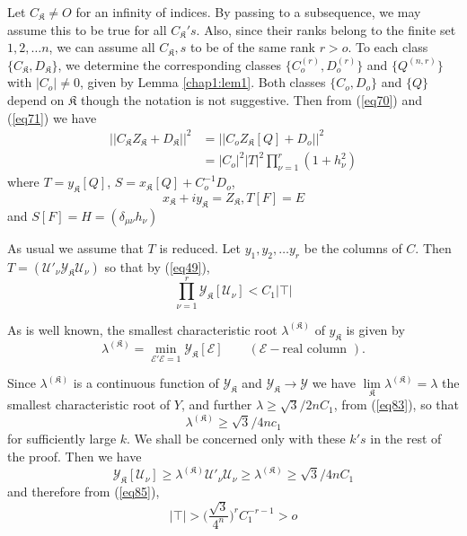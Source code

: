 \medskip
{}
Let $C_\mathfrak{K}\neq O$ for an infinity of indices. By passing to a
subsequence, we may assume this to be true for all
$C_\mathfrak{K}'s$. Also, since their ranks belong to the finite set
$1, 2, \ldots n$, we can assume all $C_\mathfrak{K}, s$ to be of the
same rank $r > o$. To each class $\{C_\mathfrak{K}, D_\mathfrak{K} \}$,
we determine the corresponding classes $\{C^{(r)}_o, D^{(r)}_o\}$ and
$\{Q^{(n, r)}\}$ with $|C_o | \neq 0$, given by Lemma \ref{chap1:lem1}. Both
classes $\{C_o, D_o\}$ and $\{Q \}$ depend on $\mathfrak{K}$ though the
notation is not suggestive. Then from (\ref{eq70}) and (\ref{eq71}) we have 
\begin{align*}
||C_\mathfrak{K}Z_\mathfrak{K} + D_\mathfrak{K} ||^2 &= ||C_o
Z_\mathfrak{K}[Q] + D_o ||^2 \\ 
&= | C_o |^2 | T |^2 \prod^r_{\nu =1}(1 + h^2_\nu ) \tag{84}\label{eq84}   
\end{align*}
where $T = y_\mathfrak{K}[Q]$, $S = x_\mathfrak{K} [Q] + C^{-1}_o D_o$,
$$
x_\mathfrak{K} + i y_\mathfrak{K} = Z_\mathfrak{K}, T[F] = E
$$
and $S[F] = H = (\delta_{\mu \nu} h_\nu)$

As usual we assume that $T$ is reduced. Let
$y_1, y_2,\ldots y_r$ be the colu\-mns of
$C$. Then $T=(\mathscr{U}'_\nu \mathcal{Y}_\mathfrak{K}
\mathscr{U}_\nu)$ so that by (\ref{eq49}), 
\begin{equation*}
\prod^r_{\nu =1} \mathcal{Y}_\mathfrak{K}[\mathscr{U}_\nu] < C_1 | \top
| \tag{85}\label{eq85}    
\end{equation*}
 
As is well known, the smallest characteristic root
$\lambda^{(\mathfrak{K})}$ of $y_\mathfrak{K}$ is given\pageoriginale
by  
$$
\lambda^{(\mathfrak{K})} = \min_{\mathcal{E'} \mathcal{E} =
  1}\mathcal{Y}_\mathfrak{K} [\mathcal{E}] \qquad (\mathcal{E}- \text{
  real column }). 
$$


Since $\lambda^{(\mathfrak{K})}$ is a continuous function of
$\mathcal{Y}_\mathfrak{K}$ and $\mathcal{Y}_\mathfrak{K} \to
\mathcal{Y}$ we have $\lim\limits_\mathfrak{K}
\lambda^{(\mathfrak{K})}=\lambda$ the smallest characteristic root of
$Y$, and further $\lambda \geq \sqrt{3}/2nC_1$, from (\ref{eq83}), so that 
\begin{equation*}
\lambda^{(\mathfrak{K})} \geq \sqrt{3}/4 nc_1 \tag{86}\label{eq86}   
\end{equation*}
for sufficiently large $k$. We shall be concerned only with these
$k's$ in the rest of the proof. Then we have 
$$
\mathcal{Y}_\mathfrak{K}[\mathscr{U}_\nu] \geq \lambda^{(\mathfrak{K})}
\mathscr{U'}_\nu \mathscr{U}_\nu \geq \lambda^{(\mathfrak{K})} \geq
\sqrt{3}/4 nC_1 
$$
and therefore from (\ref{eq85}),
\begin{equation*}
| \top | > \bigg(\frac{\sqrt{3}}{4^n}\bigg)^r C_1^{- r - 1} > o
\tag{87}\label{eq87}    
\end{equation*}

